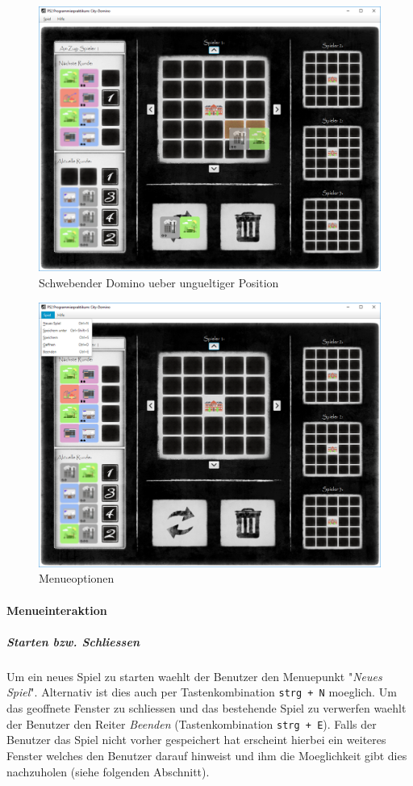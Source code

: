 \begin{figure}
	\centering
	\includegraphics{screenshots/screenshot_HovernRot}
	\caption{Schwebender Domino ueber ungueltiger Position}
	\label{fig:hovernRot}
\end{figure}


\newpage

\begin{figure}
	\centering
	\includegraphics{screenshots/screenshot_Menue}
	\caption{Menueoptionen}
	\label{fig:menueoptionen}
\end{figure}

\paragraph{Menueinteraktion}
\subparagraph{Starten bzw. Schliessen}
Um ein neues Spiel zu starten waehlt der Benutzer den Menuepunkt "\emph{Neues Spiel}". Alternativ ist dies auch per Tastenkombination \verb|strg + N| moeglich. Um das geoffnete Fenster zu schliessen und das bestehende Spiel zu verwerfen waehlt der Benutzer den Reiter \emph{Beenden} (Tastenkombination \verb|strg + E|). Falls der Benutzer das Spiel nicht vorher gespeichert hat erscheint hierbei ein weiteres Fenster welches den Benutzer darauf hinweist und ihm die Moeglichkeit gibt dies nachzuholen (siehe folgenden Abschnitt).

